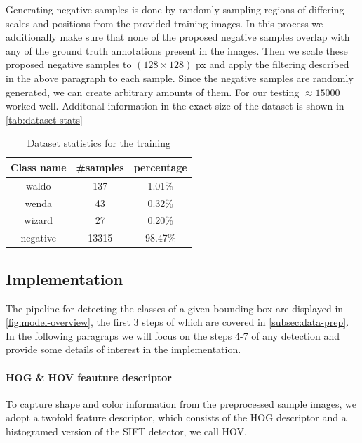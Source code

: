 \documentclass[11pt]{article}
\begin{document}
\vspace{0.5cm}
Generating negative samples is done by randomly sampling regions of differing scales and positions from the provided training images.
In this process we additionally make sure that none of the proposed negative samples overlap with any of the ground truth annotations present in the images.
Then we scale these proposed negative samples to \( (128 \times 128 ) \) px and apply the filtering described in the above paragraph to each sample.
Since the negative samples are randomly generated, we can create arbitrary amounts of them. 
For our testing \( \approx15000 \) worked well. 
Additonal information in the exact size of the dataset is shown in \autoref{tab:dataset-stats}

\begin{table}[]
    \centering
    \begin{tabular}{ccc}
        \toprule
        Class name & \#samples & percentage \\
        \midrule
        waldo & 137 &  1.01\% \\
        wenda & 43&  0.32\% \\
        wizard& 27&  0.20\% \\
        negative & 13315&  98.47\% \\
        \bottomrule
    \end{tabular}
    \caption{Dataset statistics for the training}
    \label{tab:dataset-stats}
\end{table}


\subsection{Implementation}\label{subsec:implementation}

The pipeline for detecting the classes of a given bounding box are displayed in \autoref{fig:model-overview},
the first 3 steps of which are covered in \autoref{subsec:data-prep}. In the following paragraps we will focus on the
steps 4-7 of any detection and provide some details of interest in the implementation.

\paragraph{HOG \& HOV feauture descriptor}
To capture shape and color information from the preprocessed sample images, we adopt a twofold feature descriptor, 
which consists of the HOG descriptor and a histogramed version of the SIFT detector, we call HOV.
\end{document}

